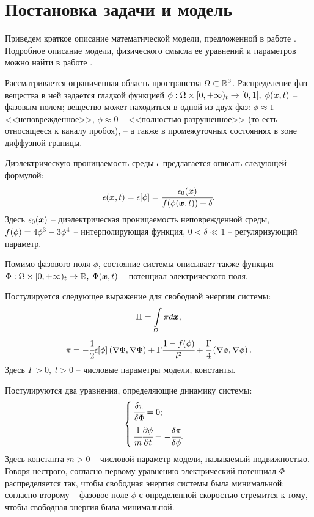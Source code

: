 
\section{Постановка задачи и модель}

Приведем краткое описание математической модели, предложенной в работе \cite{pitike_dielectric_breakdown}. Подробное описание модели, физического смысла ее уравнений и параметров можно найти в работе \cite{ponomarev_stability}.

Рассматривается ограниченная область пространства $\Omega \subset {\mathbb{R}}^3$. Распределение фаз вещества в ней задается гладкой функцией $\phi: \Omega \times [0, +\infty)_t \hm \to [0, 1], \; \phi(\vx, t)$ -- фазовым полем; вещество может находиться в одной из двух фаз: $\phi \approx 1$ -- <<неповрежденное>>, $\phi \approx 0$ -- <<полностью разрушенное>> (то есть относящееся к каналу пробоя), -- а также в промежуточных состояниях в зоне диффузной границы.

Диэлектрическую проницаемость среды $\epsilon$ предлагается описать следующей формулой:
\begin{equation}
	\epsilon({\boldsymbol{x}}, t) = \epsilon[\phi] = \cfrac{\epsilon_0({\boldsymbol{x}})}{f(\phi({\boldsymbol{x}}, t)) + \delta} {\text{.}}
	\label{eq:epsilon}
\end{equation}
Здесь $\epsilon_0({\boldsymbol{x}})$ -- диэлектрическая проницаемость неповрежденной среды, $f(\phi) \hm = 4\phi^3 - 3\phi^4$ -- интерполирующая функция, $0 < \delta \ll 1$ -- регуляризующий параметр.

Помимо фазового поля $\phi$, состояние системы описывает также функция $\Phi: \Omega \times [0, +\infty)_t \to {\mathbb{R}}, \; \Phi({\boldsymbol{x}}, t)$ -- потенциал электрического поля.

Постулируется следующее выражение для свободной энергии системы:
$$\Pi = \int \limits_\Omega \pi d {\boldsymbol{x}} {\text{,}}$$
$$\pi = -\cfrac{1}{2} \epsilon[\phi] \left( \nabla \Phi, \nabla \Phi \right) + \Gamma \cfrac{1 - f(\phi)}{l^2} + \cfrac{\Gamma}{4} \left( \nabla \phi, \nabla \phi \right) {\text{.}}$$
Здесь $\Gamma > 0, \; l > 0$ -- числовые параметры модели, константы.

Постулируются два уравнения, определяющие динамику системы:
\begin{equation*}
\begin{cases}
	\cfrac{\delta \pi}{\delta \Phi} = 0 {\text{;}} \\[3mm]
	\cfrac{1}{m} \cfrac{\partial \phi}{\partial t} = -\cfrac{\delta \pi}{\delta \phi} {\text{.}}
\end{cases}
\end{equation*}
Здесь константа $m > 0$ -- числовой параметр модели, называемый подвижностью. Говоря нестрого, согласно первому уравнению электрический потенциал $\Phi$ распределяется так, чтобы свободная энергия системы была минимальной; согласно второму -- фазовое поле $\phi$ с определенной скоростью стремится к тому, чтобы свободная энергия была минимальной.

